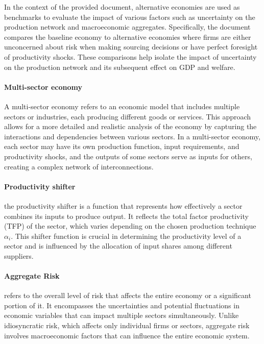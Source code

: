 \documentclass[11pt]{article}
\theoremstyle{definition}
\begin{document}
	In the context of the provided document, alternative economies are used as benchmarks to evaluate the impact of various factors such as uncertainty on the production network and macroeconomic aggregates. Specifically, the document compares the baseline economy to alternative economies where firms are either unconcerned about risk when making sourcing decisions or have perfect foresight of productivity shocks. These comparisons help isolate the impact of uncertainty on the production network and its subsequent effect on GDP and welfare.
	
	\paragraph{Multi-sector economy} A multi-sector economy refers to an economic model that includes multiple sectors or industries, each producing different goods or services. This approach allows for a more detailed and realistic analysis of the economy by capturing the interactions and dependencies between various sectors. In a multi-sector economy, each sector may have its own production function, input requirements, and productivity shocks, and the outputs of some sectors serve as inputs for others, creating a complex network of interconnections.
	
	\paragraph{Productivity shifter} the productivity shifter is a function that represents how effectively a sector combines its inputs to produce output. It reflects the total factor productivity (TFP) of the sector, which varies depending on the chosen production technique $\alpha_i$. This shifter function is crucial in determining the productivity level of a sector and is influenced by the allocation of input shares among different suppliers.	
	
	\paragraph{Aggregate Risk} refers to the overall level of risk that affects the entire economy or a significant portion of it. It encompasses the uncertainties and potential fluctuations in economic variables that can impact multiple sectors simultaneously. Unlike idiosyncratic risk, which affects only individual firms or sectors, aggregate risk involves macroeconomic factors that can influence the entire economic system.
	
\end{document}
